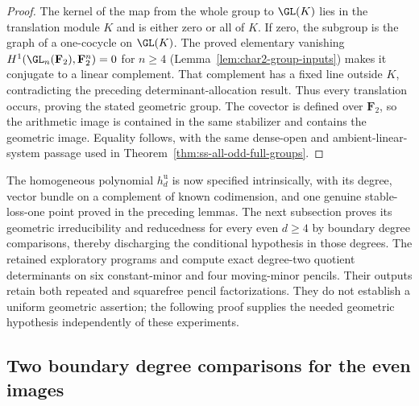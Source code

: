 \begin{proof}
The kernel of the map from the whole group to $\GL(K)$ lies
in the translation module $K$ and is either zero or all of $K$.
If zero, the subgroup is the graph of a one-cocycle on $\GL(K)$.
The proved elementary vanishing
$H^1(\GL_n(\mathbf F_2),\mathbf F_2^n)=0$ for $n\ge4$
(Lemma~\ref{lem:char2-group-inputs}) makes it conjugate to a
linear complement. That complement has a fixed line outside
$K$, contradicting the preceding determinant-allocation result.
Thus every translation occurs, proving the stated geometric group.
The covector is defined over $\mathbf F_2$, so the arithmetic
image is contained in the same stabilizer and contains the
geometric image. Equality follows, with the same dense-open and
ambient-linear-system passage used in
Theorem~\ref{thm:ss-all-odd-full-groups}.
\end{proof}

\begin{remark}\label{auto:A_monodromy:feea204b71c7}

The homogeneous polynomial $h_d^{\mathrm u}$ is now specified
intrinsically, with its degree, vector bundle on a complement of
known codimension, and one genuine stable-loss-one point proved
in the preceding lemmas. The next subsection proves its geometric irreducibility and
reducedness for every even $d\ge4$ by boundary degree comparisons,
thereby discharging the conditional hypothesis in those degrees.
The retained exploratory programs
 and
compute exact degree-two quotient determinants on six constant-minor
and four moving-minor pencils. Their outputs retain both repeated
and squarefree pencil factorizations. They do not establish a
uniform geometric assertion; the following proof supplies the needed
geometric hypothesis independently of these experiments.
\end{remark}


\subsection{Two boundary degree comparisons for the even images}
\label{subsec:ss-all-even-groups}

